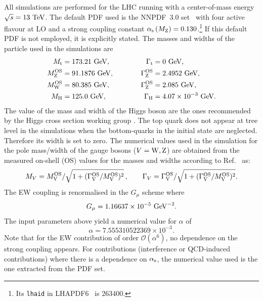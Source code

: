 \documentclass[11pt]{cernrep}
\begin{document}
All simulations are performed for the LHC running with a center-of-mass energy $\sqrt s = 13 {\rm~TeV}$.
The default PDF used is the NNPDF~3.0 set~\cite{Ball:2014uwa} with four active flavour at LO and a strong coupling constant $\alpha_{\rm s}\left( M_{\rm Z} \right) = 0.130$.\footnote{Its {\tt lhaid} in LHAPDF6~\cite{Buckley:2014ana} is 263400.} 
If this default PDF is not employed, it is explicitly stated.
%
The masses and widths of the particle used in the simulations are
%
\begin{alignat}{2}
                M_{\rm t}   &=  173.21 {\rm~GeV},             & \quad \quad \quad \Gamma_{\rm t} &= 0 {\rm~GeV},  \nonumber \\
                M_{\rm Z}^{\rm OS} &=  91.1876{\rm~GeV},      & \quad \quad \quad \Gamma^{\rm OS}_{\rm Z} &= 2.4952{\rm~GeV},  \nonumber \\
                M_{\rm W}^{\rm OS} &=  80.385{\rm~GeV},       & \Gamma^{\rm OS}_{\rm Z} &= 2.085{\rm~GeV},  \nonumber \\
                M_{\rm H} &=  125.0{\rm~GeV}, 		      & \Gamma_{\rm H}   &=  4.07 \times 10^{-3}{\rm~GeV}.
\end{alignat}
%
The value of the mass and width of the Higgs boson are the ones recommended by the Higgs cross section working group \cite{deFlorian:2016spz}.
The top quark does not appear at tree level in the simulations when the bottom-quarks in the initial state are neglected.
Therefore its width is set to zero.
The numerical values used in the simulation for the pole mass/width of the gauge bosons ($V={\rm W,Z}$) are obtained from the measured on-shell (OS) values for the masses and widths according to Ref.~\cite{Bardin:1988xt} as:
%
\begin{equation}
        M_V = M_{\rm V}^{\rm OS}/\sqrt{1+(\Gamma_{\rm V}^{\rm OS}/M_{\rm V}^{\rm OS})^2}\,,\qquad  \Gamma_V = \Gamma_{\rm V}^{\rm OS}/\sqrt{1+(\Gamma_{\rm V}^{\rm OS}/M_{\rm V}^{\rm OS})^2}.
\end{equation}
%
The EW coupling is renormalised in the $G_\mu$ scheme \cite{Denner:2000bj} where
%
\begin{equation}
    G_{\mu}    = 1.16637\times 10^{-5}{\rm~GeV}^{-2}.
\end{equation}
%
The input parameters above yield a numerical value for $\alpha$ of
%
\begin{equation}
 \alpha = 7.555310522369 \times 10^{-3}.
\end{equation}
%
Note that for the EW contribution of order $\mathcal{O} (\alpha^6)$, no dependence on the strong coupling appears.
For contributions (interference or QCD-induced contributions) where there is a dependence on $\alpha_{\rm s}$, the numerical value used is the one extracted from the PDF set.
\end{document}

